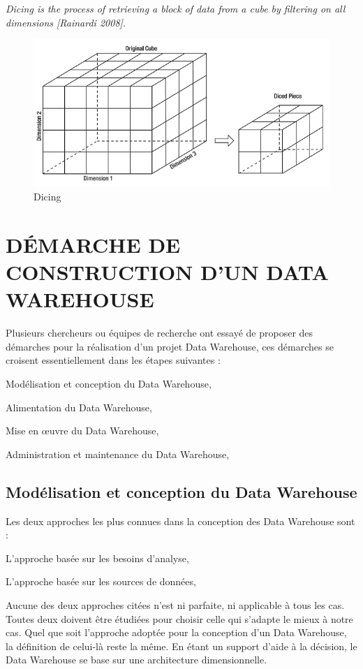 \textit{Dicing is the process of retrieving a block of data from a cube by filtering on all dimensions [Rainardi 2008].}
  
    \begin{figure}[h]
	\begin{center}
		\includegraphics[scale=0.85]{images/dicing.png}
		\caption{Dicing}
		\label{slicing-image}
	\end{center}
   \end{figure}
   
   
   
\section{DÉMARCHE DE CONSTRUCTION D’UN DATA WAREHOUSE}   
   Plusieurs chercheurs ou équipes de recherche ont essayé de proposer des démarches pour la réalisation d’un projet Data Warehouse, ces démarches se croisent essentiellement dans les étapes suivantes :
\begin{list}{•}{ }
   \item Modélisation et conception du Data Warehouse,
   \item Alimentation du Data Warehouse,
   \item Mise en œuvre du Data Warehouse,
   \item Administration et maintenance du Data Warehouse,\\
\end{list}

\subsection{Modélisation et conception du Data Warehouse}

Les deux approches les plus connues dans la conception des Data Warehouse sont :
\begin{list}{•}{ }
   \item L’approche basée sur les besoins d’analyse,
    \item L’approche basée sur les sources de données,\\
\end{list}
Aucune des deux approches citées n’est ni parfaite, ni applicable à tous les cas. Toutes deux doivent être étudiées pour choisir celle qui s’adapte le mieux à notre cas. Quel que soit l’approche adoptée pour la conception d’un Data Warehouse, la définition de celui-là reste la même. En étant un support d’aide à la décision, le Data Warehouse se base sur une architecture dimensionnelle.


